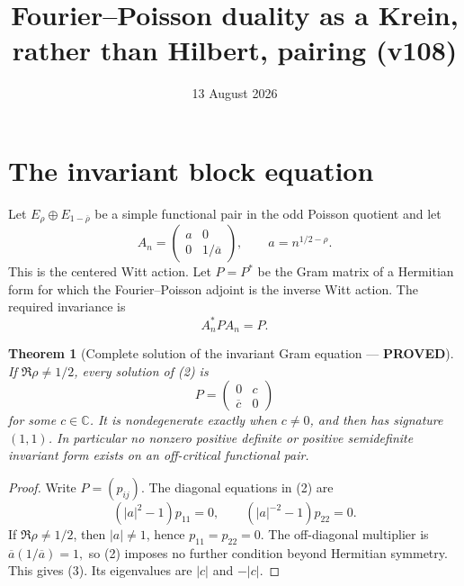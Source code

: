 \documentclass[11pt]{article}
\title{Fourier--Poisson duality as a Krein, rather than Hilbert, pairing (v108)}
\date{13 August 2026}
\newcommand{\PROVED}{\textcolor{green!40!black}{\textbf{PROVED}}}
\newtheorem{theorem}{Theorem}
\begin{document}
\maketitle

\section{The invariant block equation}

Let $E_\rho\oplus E_{1-\overline\rho}$ be a simple functional pair in the
odd Poisson quotient and let
\begin{equation}
 A_n=\begin{pmatrix}a&0\\0&1/\overline a\end{pmatrix},
 \qquad a=n^{1/2-\rho}.                                    \tag{1}
\end{equation}
This is the centered Witt action.  Let $P=P^*$ be the Gram matrix of a
Hermitian form for which the Fourier--Poisson adjoint is the inverse Witt
action.  The required invariance is
\begin{equation}
                         A_n^*PA_n=P.                         \tag{2}
\end{equation}

\begin{theorem}[Complete solution of the invariant Gram equation ---
\PROVED]
If $\Re\rho\ne1/2$, every solution of (2) is
\begin{equation}
                         P=\begin{pmatrix}0&c\\\overline c&0\end{pmatrix}
                                                               \tag{3}
\end{equation}
for some $c\in\mathbb C$.  It is nondegenerate exactly when $c\ne0$, and
then has signature $(1,1)$.  In particular no nonzero positive definite or
positive semidefinite invariant form exists on an off-critical functional
pair.
\end{theorem}

\begin{proof}
Write $P=(p_{ij})$.  The diagonal equations in (2) are
\[
 (|a|^2-1)p_{11}=0,
 \qquad (|a|^{-2}-1)p_{22}=0.
\]
If $\Re\rho\ne1/2$, then $|a|\ne1$, hence $p_{11}=p_{22}=0$.  The
off-diagonal multiplier is
\(
 \overline a(1/\overline a)=1,
\)
so (2) imposes no further condition beyond Hermitian symmetry.  This gives
(3).  Its eigenvalues are $|c|$ and $-|c|$.
\end{proof}
\end{document}
